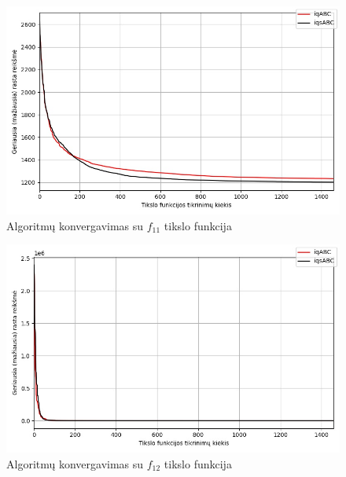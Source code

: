 \documentclass{VUMIFPSmagistrinis}
\begin{document}
\begin{landscape}
\begin{multicols}{2}
\begin{figure}[H]
    \centering
    \includegraphics[scale=0.5]{img/2kg/f11.jpg}
    \caption{Algoritmų konvergavimas su $f_{11}$ tikslo funkcija}
    \label{img:vkonf11}
\end{figure}

\begin{figure}[H]
    \centering
    \includegraphics[scale=0.5]{img/2kg/f12.jpg}
    \caption{Algoritmų konvergavimas su $f_{12}$ tikslo funkcija}
    \label{img:vkonf12}
\end{figure}






\end{multicols}
\begin{multicols}{2}


\end{multicols}
\end{landscape}
\end{document}
